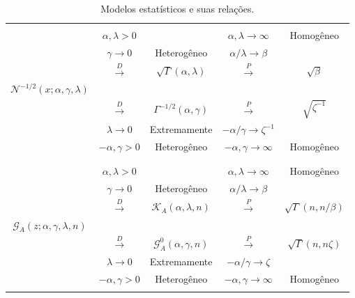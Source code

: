 \begin{table}[h]
 \caption{Modelos estatísticos e suas relações.}%
 \label{Tb:X_models}
  \centering
\begin{tabular}{c c c c c}
 \hline
 &&&&\\
                                             &$\alpha ,\lambda  > 0$    &                               &$\alpha ,\lambda \rightarrow\infty$  &Homogêneo \\
                                             &$\gamma  \to 0$           & Heterogêneo                   &$\alpha / \lambda \rightarrow \beta$ & \\
                                             &$\mathop  \to \limits^D $ & $\sqrt\Gamma(\alpha,\lambda)$ &$\mathop  \to \limits^P $            &$\sqrt\beta$        \\
$\mathcal{N}^{-1/2}(x;\alpha,\gamma,\lambda)$& & & &\\
                                             &$\mathop  \to \limits^D $ & $\Gamma^{-1/2}(\alpha,\gamma)$&$\mathop  \to \limits^P $   &$\sqrt{\zeta^{-1}}$ \\
                                             &$\lambda \to 0$           &  Extremamente                 &$-\alpha / \gamma \rightarrow \zeta^{-1}$ & \\
                                             &$-\alpha ,\gamma   > 0$   &  Heterogêneo                  &$-\alpha ,\gamma \rightarrow\infty$ &Homogêneo \\
 &&&& \\
 \hline
 &&&&\\
                                             &$\alpha ,\lambda  > 0$    &                               &$\alpha ,\lambda \rightarrow\infty$  &Homogêneo \\
                                             &$\gamma  \to 0$           & Heterogêneo                   &$\alpha / \lambda \rightarrow \beta$ & \\
                                             &$\mathop  \to \limits^D $ &$\mathcal{K}_A(\alpha,\lambda,n)$&$\mathop  \to \limits^P $&$\sqrt\Gamma(n,n/\beta)$        \\
$\mathcal{G}_A(z;\alpha,\gamma,\lambda,n)$   & & & &\\
                                             &$\mathop  \to \limits^D $ & $\mathcal{G}_A^0(\alpha,\gamma,n)$&$\mathop  \to \limits^P $&$\sqrt\Gamma(n,n\zeta)$  \\
                                             &$\lambda \to 0$           &  Extremamente                 &$-\alpha / \gamma \rightarrow \zeta$ & \\
                                             &$-\alpha ,\gamma   > 0$   &  Heterogêneo                  &$-\alpha ,\gamma \rightarrow\infty$ &Homogêneo \\
&&&&   \\
 \hline

\end{tabular}
\end{table}


